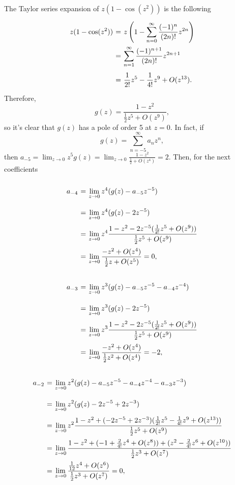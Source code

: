 The Taylor series expansion of $z(1-\cos(z^2))$ is the following
\[ \everymath{\displaystyle}
\arraycolsep=1.8pt\def\arraystretch{2.5}
\begin{array}{rcl}
    z(1-\cos(z^2)) & = & z \left( 1 - \sum_{n = 0}^{\infty} \frac{(-1)^n}{(2n)!} z^{2n} \right)\\
    & = & \sum_{n = 1}^{\infty} \frac{(-1)^{n+1}}{(2n)!} z^{2n+1}\\
    & = & \frac{1}{2!} z^5 - \frac{1}{4!} z^9 + O(z^{13}).
\end{array} \]
Therefore,
\[ g(z) = \frac{1 - z^2}{\frac{1}{2} z^5 + O(z^9)}, \]
so it's clear that $g(z)$ has a pole of order 5 at $z = 0$. In fact, if
\[ g(z) = \sum_{n = -5}^{\infty} a_{n} z^n, \]
then $a_{-5} = \lim_{z\to 0} z^5 g(z) = \lim_{z\to 0} \frac{1- z^2}{\frac{1}{2} + O(z^4)} = 2$. Then, for the next coefficients
\[ \everymath{\displaystyle}
\arraycolsep=1.8pt\def\arraystretch{2.5}
\begin{array}{rcl}
    a_{-4} & = & \lim_{z\to 0} z^4 (g(z) - a_{-5} z^{-5}) \\
    & = & \lim_{z\to 0} z^4 (g(z) - 2z^{-5})\\
    & = & \lim_{z\to 0} z^4 \frac{1-z^2 - 2z^{-5}(\frac{1}{2!} z^5 + O(z^9))}{\frac{1}{2} z^5 + O(z^9)}\\
    & = & \lim_{z\to 0} \frac{-z^2 + O(z^4)}{\frac{1}{2} z + O(z^5)} = 0,
\end{array} \]

\[ \everymath{\displaystyle}
\arraycolsep=1.8pt\def\arraystretch{2.5}
\begin{array}{rcl}
    a_{-3} & = & \lim_{z\to 0} z^3 (g(z) - a_{-5} z^{-5} - a_{-4} z^{-4}) \\
    & = & \lim_{z\to 0} z^3 (g(z) - 2z^{-5})\\
    & = & \lim_{z\to 0} z^3 \frac{1-z^2 - 2z^{-5}(\frac{1}{2!} z^5 + O(z^9))}{\frac{1}{2} z^5 + O(z^9)}\\
    & = & \lim_{z\to 0} \frac{-z^2 + O(z^4)}{\frac{1}{2} z^2 + O(z^4)} = -2,
\end{array} \]

\[ \everymath{\displaystyle}
\arraycolsep=1.8pt\def\arraystretch{2.5}
\begin{array}{rcl}
    a_{-2} & = & \lim_{z\to 0} z^2 (g(z) - a_{-5} z^{-5} - a_{-4} z^{-4} - a_{-3} z^{-3}) \\
    & = & \lim_{z\to 0} z^2 (g(z) - 2z^{-5} + 2z^{-3})\\
    & = & \lim_{z\to 0} z^2 \frac{1-z^2 + (- 2z^{-5} + 2z^{-3})(\frac{1}{2!} z^5 - \frac{1}{4!} z^9 + O(z^{13}))}{\frac{1}{2} z^5 + O(z^9)}\\
    & = & \lim_{z\to 0} \frac{1 - z^2 + (-1 + \frac{2}{4!} z^{4} + O(z^8)) + (z^2 - \frac{2}{4!} z^{6} + O(z^{10}))}{\frac{1}{2} z^3 + O(z^7)}\\
    & = & \lim_{z\to 0} \frac{\frac{1}{12} z^{4} + O(z^6) }{\frac{1}{2}z^3 + O(z^7)} = 0,
\end{array} \]

